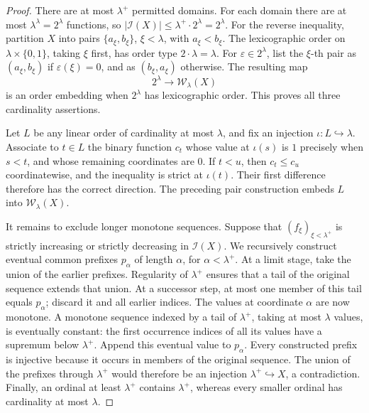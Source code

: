\documentclass[11pt]{article}
\theoremstyle{definition}
\theoremstyle{remark}
\newcommand{\WO}{\mathcal W}
\newcommand{\card}[1]{\lvert #1\rvert}
\begin{document}
\begin{proof}
There are at most \(\lambda^+\) permitted domains.  For each domain
there are at most \(\lambda^\lambda=2^\lambda\) functions, so
\(\card{\mathcal I(X)}\leq\lambda^+\cdot2^\lambda=2^\lambda\).
For the reverse inequality, partition \(X\) into pairs
\(\{a_\xi,b_\xi\}\), \(\xi<\lambda\), with \(a_\xi<b_\xi\).
The lexicographic order on \(\lambda\times\{0,1\}\), taking
\(\xi\) first, has order type \(2\cdot\lambda=\lambda\).
For \(\varepsilon\in2^\lambda\), list the \(\xi\)-th pair as
\((a_\xi,b_\xi)\) if \(\varepsilon(\xi)=0\), and as
\((b_\xi,a_\xi)\) otherwise.  The resulting map
\[
                 2^\lambda\longrightarrow\WO_\lambda(X)
\]
is an order embedding when \(2^\lambda\) has lexicographic order.
This proves all three cardinality assertions.

Let \(L\) be any linear order of cardinality at most \(\lambda\),
and fix an injection \(\iota:L\hookrightarrow\lambda\).
Associate to \(t\in L\) the binary function \(c_t\) whose value at
\(\iota(s)\) is \(1\) precisely when \(s<t\), and whose remaining
coordinates are \(0\).  If \(t<u\), then \(c_t\leq c_u\)
coordinatewise, and the inequality is strict at \(\iota(t)\).
Their first difference therefore has the correct direction.
The preceding pair construction embeds \(L\) into
\(\WO_\lambda(X)\).

It remains to exclude longer monotone sequences.  Suppose that
\((f_\xi)_{\xi<\lambda^+}\) is strictly increasing or strictly
decreasing in \(\mathcal I(X)\).
We recursively construct eventual common prefixes \(p_\alpha\)
of length \(\alpha\), for \(\alpha<\lambda^+\).
At a limit stage, take the union of the earlier prefixes.
Regularity of \(\lambda^+\) ensures that a tail of the original
sequence extends that union.  At a successor step, at most one
member of this tail equals \(p_\alpha\); discard it and all earlier
indices.  The values at coordinate \(\alpha\) are now monotone.
A monotone sequence indexed by a tail of \(\lambda^+\), taking
at most \(\lambda\) values, is eventually constant: the first
occurrence indices of all its values have a supremum below
\(\lambda^+\).  Append this eventual value to \(p_\alpha\).
Every constructed prefix is injective because it occurs in
members of the original sequence.  The union of the prefixes
through \(\lambda^+\) would therefore be an injection
\(\lambda^+\hookrightarrow X\), a contradiction.
Finally, an ordinal at least \(\lambda^+\) contains
\(\lambda^+\), whereas every smaller ordinal has cardinality
at most \(\lambda\).
\end{proof}
\end{document}
